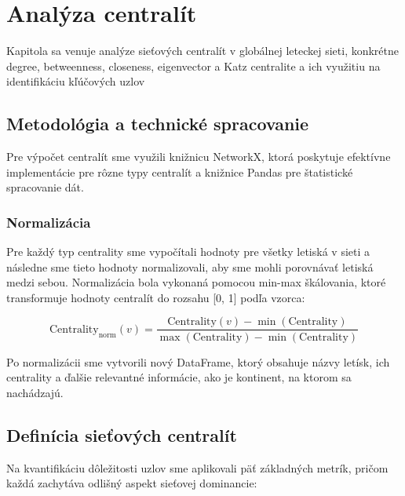 \chapter[Analýza centralít \small{(Tuan Dávid Nguyen Van)}]{Analýza centralít}
\label{centrality}

Kapitola sa venuje analýze sieťových centralít v globálnej leteckej sieti, konkrétne degree, betweenness, closeness, eigenvector a Katz 
centralite a ich využitiu na identifikáciu kľúčových uzlov


\section{Metodológia a technické spracovanie}

Pre výpočet centralít sme využili knižnicu NetworkX, ktorá poskytuje efektívne implementácie pre rôzne typy centralít
a knižnice Pandas pre štatistické spracovanie dát.

\subsection{Normalizácia}
Pre každý typ centrality sme vypočítali hodnoty pre všetky letiská v sieti a následne sme tieto hodnoty normalizovali, 
aby sme mohli porovnávať letiská medzi sebou. Normalizácia bola vykonaná pomocou min-max škálovania, ktoré transformuje
hodnoty centralít do rozsahu [0, 1] podľa vzorca:

\begin{equation}
    \text{Centrality}_{\text{norm}}(v) = \frac{\text{Centrality}(v) - \min(\text{Centrality})}{\max(\text{Centrality}) - \min(\text{Centrality})}
\end{equation}

Po normalizácii sme vytvorili nový DataFrame, ktorý obsahuje názvy letísk, ich centrality a ďalšie relevantné 
informácie, ako je kontinent, na ktorom sa nachádzajú.


\section{Definícia sieťových centralít}

Na kvantifikáciu dôležitosti uzlov sme aplikovali päť základných metrík, pričom každá zachytáva odlišný aspekt sieťovej dominancie:

